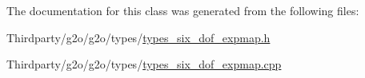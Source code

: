 The documentation for this class was generated from the following files\+:\begin{DoxyCompactItemize}
\item 
Thirdparty/g2o/g2o/types/\mbox{\hyperlink{types__six__dof__expmap_8h}{types\+\_\+six\+\_\+dof\+\_\+expmap.\+h}}\item 
Thirdparty/g2o/g2o/types/\mbox{\hyperlink{types__six__dof__expmap_8cpp}{types\+\_\+six\+\_\+dof\+\_\+expmap.\+cpp}}\end{DoxyCompactItemize}
